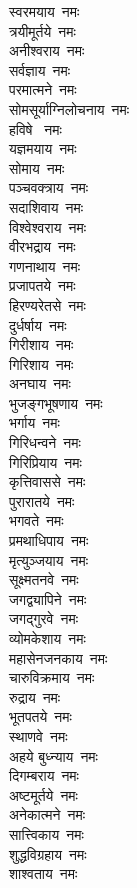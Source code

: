 \begin{multicols}{\maxColumns}
\begin{flushleft}
स्वरमयाय~नमः\\
त्रयीमूर्तये~नमः\\
अनीश्वराय~नमः\\
सर्वज्ञाय~नमः\\
परमात्मने~नमः\\
सोमसूर्याग्निलोचनाय~नमः\\
हविषे ~नमः\\
यज्ञमयाय~नमः\hfill{}\\
सोमाय~नमः\\
पञ्चवक्त्राय~नमः\\
सदाशिवाय~नमः\\
विश्वेश्वराय~नमः\\
वीरभद्राय~नमः\\
गणनाथाय~नमः\\
प्रजापतये~नमः\\
हिरण्यरेतसे~नमः\\
दुर्धर्षाय~नमः\\
गिरीशाय~नमः\hfill{}\\
गिरिशाय~नमः\\
अनघाय~नमः\\
भुजङ्गभूषणाय~नमः\\
भर्गाय~नमः\\
गिरिधन्वने~नमः\\
गिरिप्रियाय~नमः\\
कृत्तिवाससे~नमः\\
पुरारातये~नमः\\
भगवते~नमः\\
प्रमथाधिपाय~नमः\hfill{}\\
मृत्युञ्जयाय~नमः\\
सूक्ष्मतनवे~नमः\\
जगद्व्यापिने~नमः\\
जगद्गुरवे~नमः\\
व्योमकेशाय~नमः\\
महासेनजनकाय~नमः\\
चारुविक्रमाय~नमः\\
रुद्राय~नमः\\
भूतपतये~नमः\\
स्थाणवे~नमः\hfill{}\\
अहये बुध्न्याय~नमः\\
दिगम्बराय~नमः\\
अष्टमूर्तये~नमः\\
अनेकात्मने~नमः\\
सात्त्विकाय~नमः\\
शुद्धविग्रहाय~नमः\\
शाश्वताय~नमः\\

\end{flushleft}
\end{multicols}
